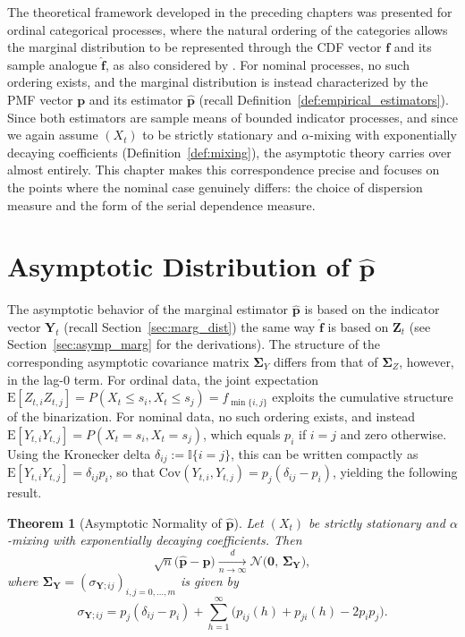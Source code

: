 ﻿\documentclass[12pt,a4paper]{scrreprt}
\newtheorem{theorem}{Theorem}[chapter]
\theoremstyle{definition}
\begin{document}
The theoretical framework developed in the preceding chapters was 
presented for ordinal categorical processes, where the natural ordering 
of the categories allows the marginal distribution to be represented 
through the CDF vector $\boldsymbol{f}$ and its sample analogue 
$\hat{\boldsymbol{f}}$, as also considered by \citet{weiss2021categorical}. 
For nominal processes, no such ordering exists, 
and the marginal distribution is instead characterized by the PMF vector 
$\boldsymbol{p}$ and its estimator $\hat{\boldsymbol{p}}$ (recall 
Definition~\ref{def:empirical_estimators}). Since both estimators are sample 
means of bounded indicator processes, and since we again assume $(X_t)$ to be strictly stationary and
$\alpha$-mixing with exponentially decaying coefficients
(Definition~\ref{def:mixing}), the asymptotic theory carries over almost entirely. 
This chapter makes this correspondence precise and focuses on the points 
where the nominal case genuinely differs: the choice of dispersion 
measure and the form of the serial dependence measure.

\section{Asymptotic Distribution of $\hat{\boldsymbol{p}}$}

The asymptotic behavior of the marginal estimator $\hat{\boldsymbol{p}}$ is based on the indicator vector $\boldsymbol{Y}_t$ (recall Section~\ref{sec:marg_dist})
the same way $\hat{\boldsymbol{f}}$ is based on $\boldsymbol{Z}_t$ (see Section~\ref{sec:asymp_marg} for the derivations). The structure of the corresponding asymptotic covariance matrix $\boldsymbol{\Sigma}_Y$
differs from that of $\boldsymbol{\Sigma}_Z$, however, in the lag-0
term. For ordinal data, the joint expectation
$\mathrm{E}[Z_{t,i}Z_{t,j}] = P(X_t \leq s_i, X_t \leq s_j) =
f_{\min\{i,j\}}$ exploits the cumulative structure of the
binarization. For nominal data, no such ordering exists, and instead
$\mathrm{E}[Y_{t,i}Y_{t,j}] = P(X_t = s_i, X_t = s_j)$, which equals
$p_i$ if $i = j$ and zero otherwise. Using the Kronecker delta
$\delta_{ij} := \mathbb{I}\{i = j\}$, this can be written compactly
as $\mathrm{E}[Y_{t,i}Y_{t,j}] = \delta_{ij}p_i$, so that
$\mathrm{Cov}(Y_{t,i}, Y_{t,j}) = p_j(\delta_{ij} - p_i)$,
yielding the following result.

\begin{theorem}[Asymptotic Normality of $\hat{\boldsymbol{p}}$]
\label{thm:clt_phat}
Let $(X_t)$ be strictly stationary and $\alpha$-mixing with
exponentially decaying coefficients. Then
\[
    \sqrt{n}\bigl(\hat{\boldsymbol{p}} - \boldsymbol{p}\bigr)
    \xrightarrow[n\to\infty]{d}
    \mathcal{N}\bigl(\boldsymbol{0},\, \boldsymbol{\Sigma}_{\boldsymbol{Y}}\bigr),
\]
where $\boldsymbol{\Sigma}_{\boldsymbol{Y}} = (\sigma_{\boldsymbol{Y};ij})_{i,j=0,\ldots,m}$ is
given by
\[
    \sigma_{\boldsymbol{Y};ij}
    = p_j(\delta_{ij} - p_i)
    + \sum_{h=1}^{\infty}\bigl(p_{ij}(h) + p_{ji}(h) - 2p_ip_j\bigr).
\]
\end{theorem}
\end{document}

